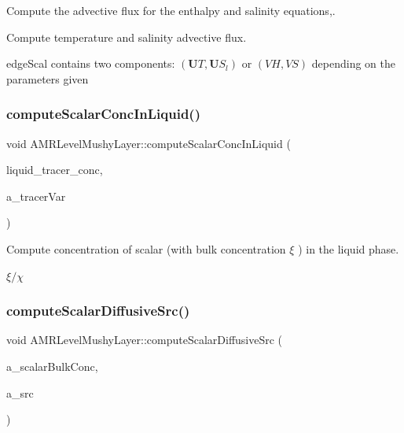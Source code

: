 Compute the advective flux for the enthalpy and salinity equations,. 

Compute temperature and salinity advective flux.

edge\+Scal contains two components\+: $ (\mathbf{U} T, \mathbf{U} S_l) $ or $ (V H, V S) $ depending on the parameters given \mbox{\label{class_a_m_r_level_mushy_layer_a0b8cde0fa8d437f3fc9a21461945af7e}} 
\subsubsection{\texorpdfstring{compute\+Scalar\+Conc\+In\+Liquid()}{computeScalarConcInLiquid()}}
{\footnotesize\ttfamily void A\+M\+R\+Level\+Mushy\+Layer\+::compute\+Scalar\+Conc\+In\+Liquid (\begin{DoxyParamCaption}\item[{\textbf{ Level\+Data}$<$ \textbf{ F\+Array\+Box} $>$ \&}]{liquid\+\_\+tracer\+\_\+conc,  }\item[{int}]{a\+\_\+tracer\+Var }\end{DoxyParamCaption})\hspace{0.3cm}{\ttfamily [protected]}}



Compute concentration of scalar (with bulk concentration $ \xi $ ) in the liquid phase. 

$ \xi/\chi $ \mbox{\label{class_a_m_r_level_mushy_layer_a414498736c19f68d326f85cd10e33512}} 
\subsubsection{\texorpdfstring{compute\+Scalar\+Diffusive\+Src()}{computeScalarDiffusiveSrc()}}
{\footnotesize\ttfamily void A\+M\+R\+Level\+Mushy\+Layer\+::compute\+Scalar\+Diffusive\+Src (\begin{DoxyParamCaption}\item[{int}]{a\+\_\+scalar\+Bulk\+Conc,  }\item[{\textbf{ Level\+Data}$<$ \textbf{ F\+Array\+Box} $>$ \&}]{a\+\_\+src }\end{DoxyParamCaption})\hspace{0.3cm}{\ttfamily [protected]}}



